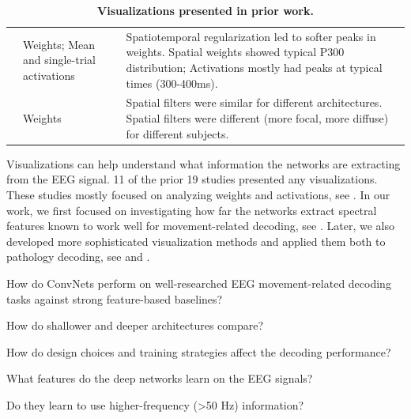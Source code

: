 \begin{table}[ht]
\begin{tabularx}{\textwidth}{p{}p{}p{}}
\cite{manor_convolutional_2015} & Weights; Mean and single-trial activations & Spatiotemporal regularization led to softer peaks in weights. Spatial weights showed typical P300 distribution; Activations mostly had peaks at typical times (300-400ms). \\
\cite{cecotti_convolutional_2011} & Weights & Spatial filters were similar for different architectures. Spatial filters were different (more focal, more diffuse) for different subjects. \\
        \bottomrule
    \end{tabularx}
    \caption[Visualizations presented in prior work.]{\textbf{Visualizations presented in prior work.}}  \label{prior-work-visualizations-table}
\end{table}


    Visualizations can help understand what information the networks are
extracting from the EEG signal. 11 of the prior 19 studies presented any
visualizations. These studies mostly focused on analyzing weights and
activations, see . In
our work, we first focused on investigating how far the networks extract
spectral features known to work well for movement-related decoding, see
. Later, we also developed
more sophisticated visualization methods and applied them both to
pathology decoding, see  and
.

\begin{openbox}
\item How do ConvNets perform on well-researched EEG movement-related decoding tasks against strong feature-based baselines?
\item How do shallower and deeper architectures compare?
\item How do design choices and training strategies affect the decoding performance?
\item What features do the deep networks learn on the EEG signals?
\item Do they learn to use higher-frequency (>50 Hz) information?
\end{openbox}
